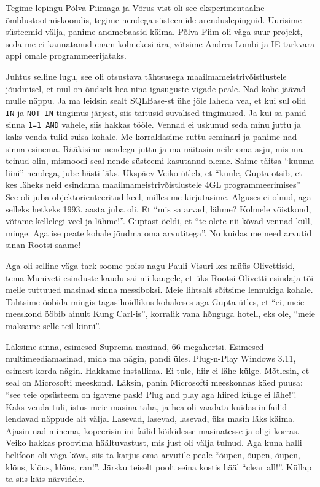 Tegime lepingu Põlva Piimaga ja Võrus vist oli see 
eksperimentaalne õmblustootmiskoondis, tegime nendega süsteemide 
arenduslepinguid. Uurisime süsteemid välja, panime andmebaasid käima.  Põlva 
Piim oli väga suur projekt, seda me ei kannatanud enam kolmekesi ära, võtsime 
Andres Lombi ja IE-tarkvara appi 
omale programmeerijataks. 

Juhtus selline lugu, see oli otsustava tähtsusega maailmameistrivõistlustele 
jõudmisel, et  mul on õudselt hea nina igasuguste vigade peale. Nad kohe jäävad 
mulle näppu. Ja ma leidsin sealt SQLBase-st ühe jõle laheda vea, et kui sul 
olid \verb|IN| ja  \verb|NOT IN| tingimus järjest, siis täitusid suvalised 
tingimused. Ja kui sa panid sinna \verb|1=1 AND| vahele, siis hakkas tööle. 
Vennad ei uskunud seda minu juttu ja kaks venda tulid suisa kohale. Me 
korraldasime  ruttu seminari ja panime nad sinna esinema. Rääkisime nendega 
juttu ja ma näitasin neile oma asju, mis ma teinud olin, mismoodi seal nende 
süsteemi kasutanud oleme. Saime täitsa \enquote{kuuma liini} nendega, jube 
hästi läks. Ükspäev Veiko ütleb, et \enquote{kuule, 
Gupta otsib, et kes läheks neid esindama 
maailmameistrivõistlustele 4GL programmeerimises} See oli juba 
objektorienteeritud keel, milles me kirjutasime. Alguses ei olnud, aga selleks 
hetkeks 1993. aasta juba oli. Et \enquote{mis sa arvad, lähme? Kolmele 
võistkond, võtame kellelegi veel ja lähme!}. Guptast öeldi, et \enquote{te 
olete nii kõvad vennad küll, minge. Aga ise peate kohale jõudma oma 
arvutitega}. No kuidas me need arvutid sinan Rootsi saame! 

Aga oli selline väga tark soome poiss nagu Pauli Visuri kes müüs Olivettisid, tema Muniveti esinduste kaudu sai nii kaugele, et 
üks Rootsi Olivetti esindaja tõi meile tuttuued masinad sinna messiboksi. Meie 
lihtsalt sõitsime lennukiga kohale. Tahtsime ööbida mingis tagasihoidlikus 
kohakeses aga Gupta ütles, et \enquote{ei, meie meeskond ööbib ainult Kung 
Carl-is}, korralik vana hõnguga hotell, eks ole, \enquote{meie maksame selle 
teil kinni}. 

Läksime sinna, esimesed Suprema masinad, 66 megahertsi. Esimesed 
multimeediamasinad, mida  ma nägin, pandi üles. Plug-n-Play Windows 3.11, 
esimest korda nägin. Hakkame installima. Ei tule, hiir ei lähe külge. Mõtlesin, 
et seal on Microsofti meeskond. Läksin, panin Microsofti meeskonnas käed puusa: 
\enquote{see teie opsüsteem on igavene pask! Plug and play aga hiired külge ei 
lähe!}. Kaks venda tuli, istus meie masina taha, ja hea oli vaadata kuidas 
inifailid lendavad näppude alt 
välja. Lasevad, lasevad, lasevad, üks masin läks käima. Ajasin nad minema, 
kopeerisin ini failid kõikidesse masinatesse ja oligi  korras.  Veiko hakkas 
proovima häältuvastust, mis just oli välja tulnud. Aga kuna halli helifoon oli 
väga kõva, siis ta karjus oma arvutile peale \enquote{õupen, õupen, õupen, 
klõus, klõus, klõus, ran!}. Järsku teiselt poolt seina kostis hääl 
\enquote{clear all!}. Küllap ta siis käis närvidele. 

